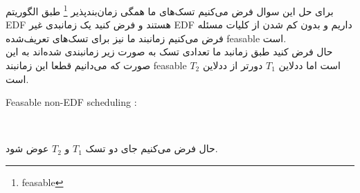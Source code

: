 برای حل این سوال فرض می‌کنیم تسک‌های ما همگی زمان‌بندپذیر
\footnote{feasable}
طبق الگوریتم 
EDF
هستند و فرض کنید یک زمانبدی غیر 
EDF
داریم و بدون کم شدن از کلیات مسئله فرض می‌کنیم زمانبند ما نیز برای تسک‌های تعریف‌شده 
feasable
است.
\\
حال فرض کنید طبق زمانبد ما تعدادی تسک به صورت زیر زمانبندی شده‌اند به این صورت که می‌دانیم قطعا این زمانبند feasable 
است اما ددلاین $T_1$
دورتر از ددلاین $T_2$ است.
\\
\begin{latin}
  Feasable non-EDF scheduling : 
\\
\end{latin}
حال فرض می‌کنیم جای دو تسک $T_1$ و $T_2$ عوض شود.

